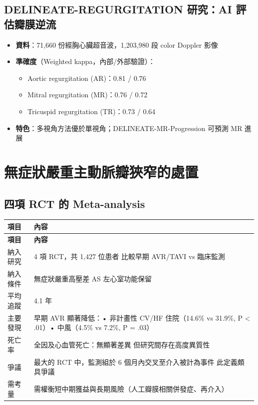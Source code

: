 \documentclass[12pt,a4paper]{article}
\begin{document}
\subsection{DELINEATE-REGURGITATION 研究：AI 評估瓣膜逆流}

\begin{itemize}
    \item \textbf{資料}：71,660 份經胸心臟超音波，1,203,980 段 color Doppler 影像
    \item \textbf{準確度}（Weighted kappa，內部/外部驗證）：
    \begin{itemize}
        \item Aortic regurgitation (AR)：0.81 / 0.76
        \item Mitral regurgitation (MR)：0.76 / 0.72
        \item Tricuspid regurgitation (TR)：0.73 / 0.64
    \end{itemize}
    \item \textbf{特色}：多視角方法優於單視角；DELINEATE-MR-Progression 可預測 MR 進展
\end{itemize}


\section{無症狀嚴重主動脈瓣狹窄的處置}

\subsection{四項 RCT 的 Meta-analysis}

\begin{longtable}{p{4cm}p{10cm}}
\toprule
\textbf{項目} & \textbf{內容} \\
\midrule
\endfirsthead
\midrule
\textbf{項目} & \textbf{內容} \\
\midrule
\endhead
\bottomrule
\endfoot
納入研究 & 4 項 RCT，共 1,427 位患者 \newline 比較早期 AVR/TAVI vs 臨床監測 \\
\midrule
納入條件 & 無症狀嚴重高壓差 AS \newline 左心室功能保留 \\
\midrule
平均追蹤 & 4.1 年 \\
\midrule
主要發現 & 早期 AVR 顯著降低：\newline • 非計畫性 CV/HF 住院（14.6\% vs 31.9\%, P < .01）\newline • 中風（4.5\% vs 7.2\%, P = .03）\\
\midrule
死亡率 & 全因及心血管死亡：無顯著差異 \newline 但研究間存在高度異質性 \\
\midrule
爭議 & 最大的 RCT 中，監測組於 6 個月內交叉至介入被計為事件 \newline 此定義頗具爭議 \\
\midrule
需考量 & 需權衡短中期獲益與長期風險（人工瓣膜相關併發症、再介入） \\
\bottomrule
\end{longtable}
\end{document}
